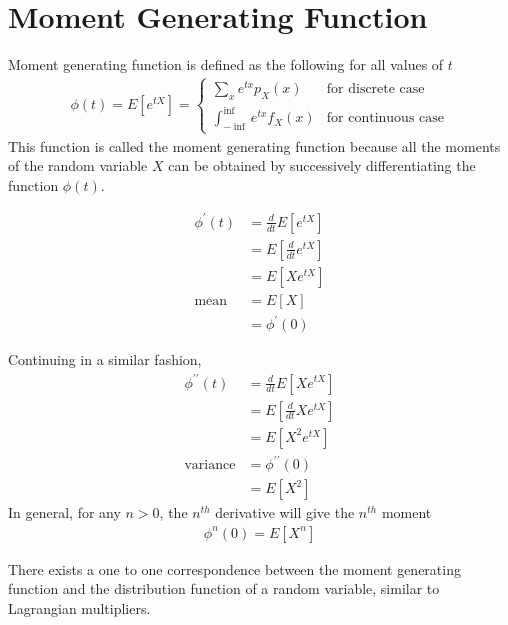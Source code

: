 \documentclass[../probability-notes.tex]{subfiles}
\begin{document}
    \chapter{Moment Generating Function}
    Moment generating function is defined as the following for all values of $t$
    \begin{align*}
        \phi (t) = E[e^{tX}] = \begin{cases} \sum_{x} e^{tx} p_{X}(x) &\mbox{for discrete case}\\
        \int_{-\inf}^{\inf} e^{tx} f_{X}(x) &\mbox{for continuous case} \end{cases} 
    \end{align*}
    This function is called the moment generating function because all the moments of the random variable $X$ can be obtained by successively differentiating the function $\phi(t)$.\newline

    \begin{align*}
        \phi^{\prime}(t) &= \frac{d}{dt} E[e^{tX}]\\
        &= E[\frac{d}{dt} e^{tX}]\\
        &= E[Xe^{tX}]\\
        \text{mean} &= E[X]\\ 
        &= \phi^{\prime}(0)
    \end{align*}

    Continuing in a similar fashion,
    \begin{align*}
        \phi^{\prime\prime}(t) &= \frac{d}{dt} E[Xe^{tX}]\\
        &= E[\frac{d}{dt}Xe^{tX}]\\
        &= E[X^{2}e^{tX}]\\
        \text{variance} &= \phi^{\prime\prime}(0)\\
        &= E[X^{2}]
    \end{align*}
    In general, for any $n > 0$, the $n^{th}$ derivative will give the $n^{th}$ moment
    \begin{align*}
        \phi^{n}(0) = E[X^{n}]
    \end{align*}

    There exists a one to one correspondence between the moment generating function and the distribution function of a random variable, similar to Lagrangian multipliers.

\end{document}

